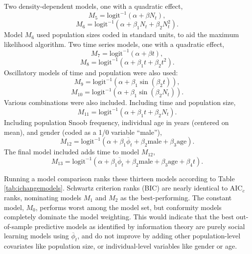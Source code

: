 \documentclass[11pt]{article}
\begin{document}
Two density-dependent models, one with a quadratic effect,
	\[ M_5 = \mathrm{logit}^{-1}(\alpha + \beta N_t),\]
	\[ M_6 = \mathrm{logit}^{-1}(\alpha + \beta_1 N_t + \beta_2 N_t^2).\]
Model $M_6$ used population sizes coded in standard units, to aid the maximum likelihood algorithm. Two time series models, one with a quadratic effect,
	\[ M_7 = \mathrm{logit}^{-1}(\alpha + \beta t),\]
	\[ M_8 = \mathrm{logit}^{-1}(\alpha + \beta_1 t + \beta_2 t^2 ).\]
Oscillatory models of time and population were also used:
	\[ M_9 = \mathrm{logit}^{-1}(\alpha + \beta_1 \sin (\beta_2 t)),\]
	\[ M_{10} = \mathrm{logit}^{-1}(\alpha + \beta_1 \sin (\beta_2 N_t)).\]
Various combinations were also included.  Including time and population size,
\[ M_{11} = \mathrm{logit}^{-1}(\alpha + \beta_1 t + \beta_2 N_t).\]
Including population Snoob frequency, individual age in years (centered on mean), and gender (coded as a 1/0 variable ``male''),
\[ M_{12} = \mathrm{logit}^{-1}(\alpha + \beta_1 \overline{\phi}_t + \beta_2 \mathrm{male} + \beta_3 \mathrm{age}).\]
The final model included adds time to model $M_{12}$,
\[ M_{13} = \mathrm{logit}^{-1}(\alpha + \beta_1 \overline{\phi}_t + \beta_2 \mathrm{male} + \beta_3 \mathrm{age} + \beta_4 t).\]

Running a model comparison ranks these thirteen models according to Table \ref{tab:ichangemodels}.  Schwartz criterion ranks (BIC) are nearly identical to AIC$_c$ ranks, nominating models $M_1$ and $M_2$ as the best-performing.  The constant model, $M_0$, performs worst among the model set, but conformity models completely dominate the model weighting.  This would indicate that the best out-of-sample predictive models as identified by information theory are purely social learning models using $\overline{\phi}_t$, and do not improve by adding other population-level covariates like population size, or individual-level variables like gender or age.
\end{document}
